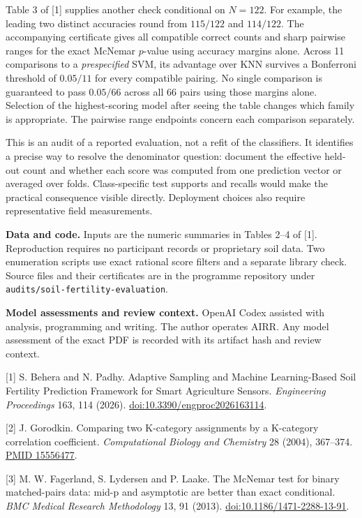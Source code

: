 \documentclass[11pt]{article}
\begin{document}
Table 3 of [1] supplies another check conditional on $N=122$. For example, the leading two distinct accuracies round from $115/122$ and $114/122$. The accompanying certificate gives all compatible correct counts and sharp pairwise ranges for the exact McNemar $p$-value using accuracy margins alone. Across 11 comparisons to a \emph{prespecified} SVM, its advantage over KNN survives a Bonferroni threshold of $0.05/11$ for every compatible pairing. No single comparison is guaranteed to pass $0.05/66$ across all 66 pairs using those margins alone. Selection of the highest-scoring model after seeing the table changes which family is appropriate. The pairwise range endpoints concern each comparison separately.

This is an audit of a reported evaluation, not a refit of the classifiers. It identifies a precise way to resolve the denominator question: document the effective held-out count and whether each score was computed from one prediction vector or averaged over folds. Class-specific test supports and recalls would make the practical consequence visible directly. Deployment choices also require representative field measurements.

\textbf{Data and code.} Inputs are the numeric summaries in Tables 2--4 of [1]. Reproduction requires no participant records or proprietary soil data. Two enumeration scripts use exact rational score filters and a separate library check. Source files and their certificates are in the programme repository under \texttt{audits/soil-fertility-evaluation}.

\textbf{Model assessments and review context.} OpenAI Codex assisted with analysis, programming and writing. The author operates AIRR. Any model assessment of the exact PDF is recorded with its artifact hash and review context.

\small
[1] S. Behera and N. Padhy. Adaptive Sampling and Machine Learning-Based Soil Fertility Prediction Framework for Smart Agriculture Sensors. \emph{Engineering Proceedings} 163, 114 (2026). \href{https://doi.org/10.3390/engproc2026163114}{doi:10.3390/engproc2026163114}.

[2] J. Gorodkin. Comparing two K-category assignments by a K-category correlation coefficient. \emph{Computational Biology and Chemistry} 28 (2004), 367--374. \href{https://pubmed.ncbi.nlm.nih.gov/15556477/}{PMID 15556477}.

[3] M. W. Fagerland, S. Lydersen and P. Laake. The McNemar test for binary matched-pairs data: mid-p and asymptotic are better than exact conditional. \emph{BMC Medical Research Methodology} 13, 91 (2013). \href{https://doi.org/10.1186/1471-2288-13-91}{doi:10.1186/1471-2288-13-91}.
\end{document}
